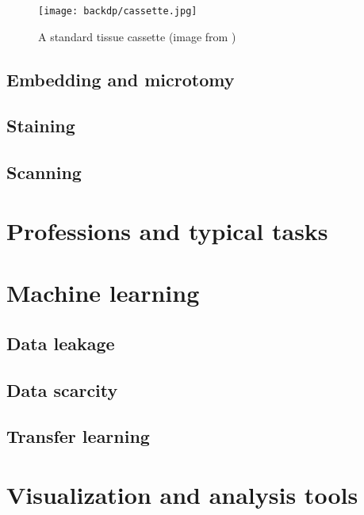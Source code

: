\begin{figure}
  \centering
  \texttt{[image: backdp/cassette.jpg]}
  \caption{A standard tissue cassette (image from \parencite{stidworthy2011getting})}
  \label{fig:backdp:cassette}
\end{figure}

\subsection{Embedding and microtomy}
\subsection{Staining}
\label{ssec:backdp:staining}
\subsection{Scanning}

\section{Professions and typical tasks}
\label{sec:backdp:professionandtasks}

\section{Machine learning}
\label{sec:backdp:ml}

\subsection{Data leakage}
\label{ssec:backdp:dataleakage}

\subsection{Data scarcity}
\label{ssec:backdp:datascarcity}

\subsection{Transfer learning}
\label{ssec:backdp:tl}

\parencite{van2019strategies}

\section{Visualization and analysis tools}

